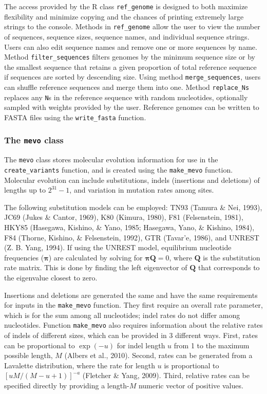 \documentclass[12pt,]{article}
\begin{document}
The access provided by the R class \texttt{ref\_genome} is designed to
both maximize flexibility and minimize copying and the chances of
printing extremely large strings to the console. Methods in
\texttt{ref\_genome} allow the user to view the number of sequences,
sequence sizes, sequence names, and individual sequence strings. Users
can also edit sequence names and remove one or more sequences by name.
Method \texttt{filter\_sequences} filters genomes by the minimum
sequence size or by the smallest sequence that retains a given
proportion of total reference sequence if sequences are sorted by
descending size. Using method \texttt{merge\_sequences}, users can
shuffle reference sequences and merge them into one. Method
\texttt{replace\_Ns} replaces any \texttt{N}s in the reference sequence
with random nucleotides, optionally sampled with weights provided by the
user. Reference genomes can be written to FASTA files using the
\texttt{write\_fasta} function.

\hypertarget{the-mevo-class}{%
\subsubsection{\texorpdfstring{The \texttt{mevo}
class}{The mevo class}}\label{the-mevo-class}}

The \texttt{mevo} class stores molecular evolution information for use
in the \texttt{create\_variants} function, and is created using the
\texttt{make\_mevo} function. Molecular evolution can include
substitutions, indels (insertions and deletions) of lengths up to
\(2^{31} - 1\), and variation in mutation rates among sites.

The following substitution models can be employed: TN93 (Tamura \& Nei,
1993), JC69 (Jukes \& Cantor, 1969), K80 (Kimura, 1980), F81
(Felsenstein, 1981), HKY85 (Hasegawa, Kishino, \& Yano, 1985; Hasegawa,
Yano, \& Kishino, 1984), F84 (Thorne, Kishino, \& Felsenstein, 1992),
GTR (Tavar\a'e, 1986), and UNREST (Z. B. Yang, 1994). If using the
UNREST model, equilibrium nucleotide frequencies (\(\mathbf{\pi}\)) are
calculated by solving for \(\mathbf{\pi} \mathbf{Q} = 0\), where
\(\mathbf{Q}\) is the substitution rate matrix. This is done by finding
the left eigenvector of \(\mathbf{Q}\) that corresponds to the
eigenvalue closest to zero.

Insertions and deletions are generated the same and have the same
requirements for inputs in the \texttt{make\_mevo} function. They first
require an overall rate parameter, which is for the sum among all
nucleotides; indel rates do not differ among nucleotides. Function
\texttt{make\_mevo} also requires information about the relative rates
of indels of different sizes, which can be provided in 3 different ways.
First, rates can be proportional to \(\exp(-u)\) for indel length \(u\)
from 1 to the maximum possible length, \(M\) (Albers et al., 2010).
Second, rates can be generated from a Lavalette distribution, where the
rate for length \(u\) is proportional to
\(\left[{u M / (M - u + 1)}\right]^{-a}\) (Fletcher \& Yang, 2009).
Third, relative rates can be specified directly by providing a
length-\(M\) numeric vector of positive values.
\end{document}
